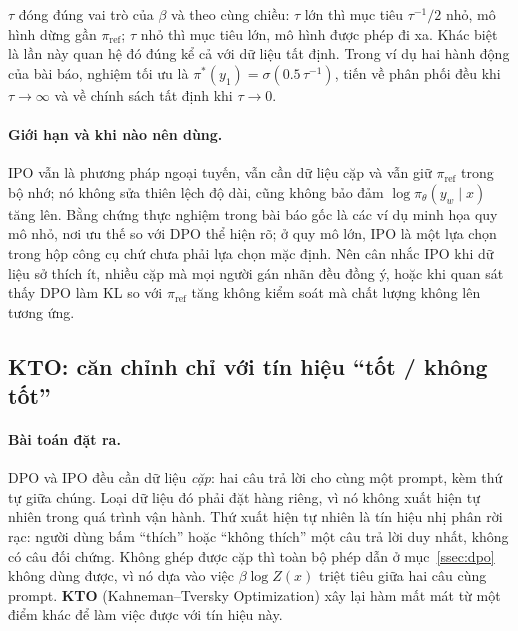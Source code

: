 \( \tau \) đóng đúng vai trò của \( \beta \) và theo cùng chiều: \( \tau \) lớn thì mục tiêu \( \tau^{-1}/2 \) nhỏ, mô hình dừng gần \( \pi_{\text{ref}} \); \( \tau \) nhỏ thì mục tiêu lớn, mô hình được phép đi xa. Khác biệt là lần này quan hệ đó đúng kể cả với dữ liệu tất định. Trong ví dụ hai hành động của bài báo, nghiệm tối ưu là \( \pi^{*}(y_1) = \sigma(0.5\,\tau^{-1}) \), tiến về phân phối đều khi \( \tau \to \infty \) và về chính sách tất định khi \( \tau \to 0 \).

\paragraph{Giới hạn và khi nào nên dùng.}
IPO vẫn là phương pháp ngoại tuyến, vẫn cần dữ liệu cặp và vẫn giữ \( \pi_{\text{ref}} \) trong bộ nhớ; nó không sửa thiên lệch độ dài, cũng không bảo đảm \( \log\pi_{\theta}(y_w \mid x) \) tăng lên. Bằng chứng thực nghiệm trong bài báo gốc là các ví dụ minh họa quy mô nhỏ, nơi ưu thế so với DPO thể hiện rõ; ở quy mô lớn, IPO là một lựa chọn trong hộp công cụ chứ chưa phải lựa chọn mặc định. Nên cân nhắc IPO khi dữ liệu sở thích ít, nhiều cặp mà mọi người gán nhãn đều đồng ý, hoặc khi quan sát thấy DPO làm KL so với \( \pi_{\text{ref}} \) tăng không kiểm soát mà chất lượng không lên tương ứng.


\subsection{KTO: căn chỉnh chỉ với tín hiệu “tốt / không tốt”}
\label{ssec:kto}

\paragraph{Bài toán đặt ra.} DPO và IPO đều cần dữ liệu \emph{cặp}: hai câu trả lời cho cùng một prompt, kèm thứ tự giữa chúng. Loại dữ liệu đó phải đặt hàng riêng, vì nó không xuất hiện tự nhiên trong quá trình vận hành. Thứ xuất hiện tự nhiên là tín hiệu nhị phân rời rạc: người dùng bấm ``thích'' hoặc ``không thích'' một câu trả lời duy nhất, không có câu đối chứng. Không ghép được cặp thì toàn bộ phép dẫn ở mục~\ref{ssec:dpo} không dùng được, vì nó dựa vào việc \( \beta\log Z(x) \) triệt tiêu giữa hai câu cùng prompt. \textbf{KTO} (Kahneman--Tversky Optimization) \cite{ethayarajh2024kto} xây lại hàm mất mát từ một điểm khác để làm việc được với tín hiệu này.


